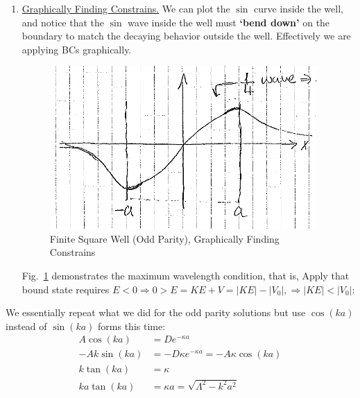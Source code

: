 \documentclass{school-22.101-notes}
\begin{document}
\begin{enumerate}
\item \uline{Graphically Finding Constrains.} We can plot the $\sin$ curve inside the well, and notice that the $\sin$ wave inside the well must \textbf{`bend down'} on the boundary to match the decaying behavior outside the well. Effectively we are applying BCs graphically. 
\begin{figure}[h!]
    \centering
    \includegraphics[width=4in]{images/qm/FSW-odd-graph-psi.png}
    \caption{Finite Square Well (Odd Parity), Graphically Finding Constrains} \label{FSW-odd-parity-graphically}
\end{figure}

Fig.~\ref{FSW-odd-parity-graphically} demonstrates the maximum wavelength condition, that is, 
Apply that bound state requires $E < 0 \Rightarrow 0 > E =  KE + V = |KE| - |V_0|, \Rightarrow |KE| <|V_0|$: 
\end{enumerate}

We essentially repeat what we did for the odd parity solutions but use $\cos(ka)$ instead of $\sin(ka)$ forms this time:
\begin{align}
A \cos (ka) &= D e^{-\kappa a} \\
-A k \sin (ka) &= - D \kappa e^{-\kappa a} = - A \kappa \cos (ka) \\
k \tan (ka) &= \kappa \\
ka \tan (ka) &= \kappa a = \sqrt{\Lambda^2 - k^2 a^2} 
\end{align}
\end{document}
